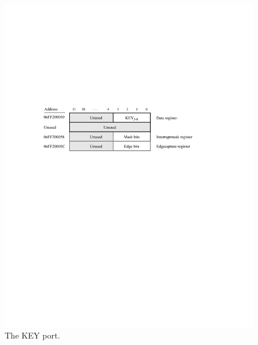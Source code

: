 \documentclass[epsfig,10pt,fullpage]{article}
\newcommand{\CommonDocsPath}{../../common/docs}
\begin{document}
\begin{figure}[htb]
	\begin{center}
	\includegraphics[scale=1]{figures/figureKEY.pdf}
	\end{center}
	\caption{The KEY port.}
\label{fig:KEY}
\end{figure}

\vskip 0.8in
\noindent
\newpage

\end{document}
